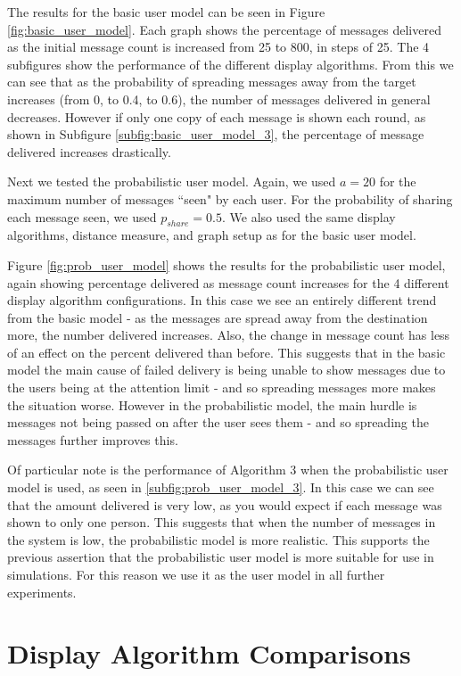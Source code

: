 \documentclass[bsc,frontabs,twoside,singlespacing,parskip,deptreport]{infthesis}     %
\begin{document}
The results for the basic user model can be seen in Figure \ref{fig:basic_user_model}. Each graph shows the percentage of messages delivered as the initial message count is increased from 25 to 800, in steps of 25. The 4 subfigures show the performance of the different display algorithms. From this we can see that as the probability of spreading messages away from the target increases (from 0, to 0.4, to 0.6), the number of messages delivered in general decreases. However if only one copy of each message is shown each round, as shown in  Subfigure \ref{subfig:basic_user_model_3}, the percentage of message delivered increases drastically.

Next we tested the probabilistic user model. Again, we used $a=20$ for the maximum number of messages ``seen" by each user. For the probability of sharing each message seen, we used $p_{share}=0.5$. We also used the same display algorithms, distance measure, and graph setup as for the basic user model.

Figure \ref{fig:prob_user_model} shows the results for the probabilistic user model, again showing percentage delivered as message count increases for the 4 different display algorithm configurations. In this case we see an entirely different trend from the basic model - as the messages are spread away from the destination more, the number delivered increases. Also, the change in message count has less of an effect on the percent delivered than before. This suggests that in the basic model the main cause of failed delivery is being unable to show messages due to the users being at the attention limit - and so spreading messages more makes the situation worse. However in the probabilistic model, the main hurdle is messages not being passed on after the user sees them - and so spreading the messages further improves this.

Of particular note is the performance of Algorithm 3 when the probabilistic user model is used, as seen in \ref{subfig:prob_user_model_3}. In this case we can see that the amount delivered is very low, as you would expect if each message was shown to only one person. This suggests that when the number of messages in the system is low, the probabilistic model is more realistic. This supports the previous assertion that the probabilistic user model is more suitable for use in simulations. For this reason we use it as the user model in all further experiments.

\section{Display Algorithm Comparisons} \label{sec:display_alg_comparisons}
\end{document}
